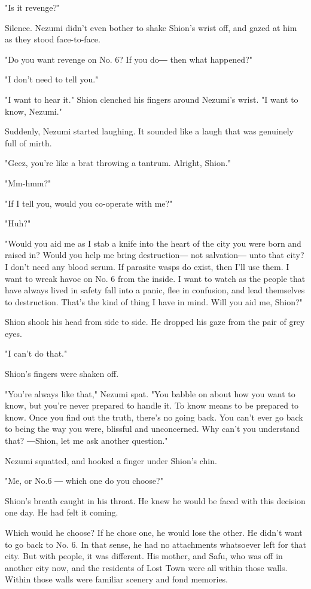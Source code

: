"Is it revenge?"

Silence. Nezumi didn't even bother to shake Shion's wrist off, and gazed
at him as they stood face-to-face.

"Do you want revenge on No. 6? If you do― then what happened?"

"I don't need to tell you."

"I want to hear it." Shion clenched his fingers around Nezumi's wrist.
"I want to know, Nezumi."

Suddenly, Nezumi started laughing. It sounded like a laugh that was
genuinely full of mirth.

"Geez, you're like a brat throwing a tantrum. Alright, Shion."

"Mm-hmm?"

"If I tell you, would you co-operate with me?"

"Huh?"

"Would you aid me as I stab a knife into the heart of the city you were
born and raised in? Would you help me bring destruction― not salvation―
unto that city? I don't need any blood serum. If parasite wasps do
exist, then I'll use them. I want to wreak havoc on No. 6 from the
inside. I want to watch as the people that have always lived in safety
fall into a panic, flee in confusion, and lead themselves to
destruction. That's the kind of thing I have in mind. Will you aid me,
Shion?"

Shion shook his head from side to side. He dropped his gaze from the
pair of grey eyes.

"I can't do that."

Shion's fingers were shaken off.

"You're always like that," Nezumi spat. "You babble on about how you
want to know, but you're never prepared to handle it. To know means to
be prepared to know. Once you find out the truth, there's no going back.
You can't ever go back to being the way you were, blissful and
unconcerned. Why can't you understand that? ―Shion, let me ask another
question."

Nezumi squatted, and hooked a finger under Shion's chin.

"Me, or No.6 ― which one do you choose?"

Shion's breath caught in his throat. He knew he would be faced with this
decision one day. He had felt it coming.

Which would he choose? If he chose one, he would lose the other. He
didn't want to go back to No. 6. In that sense, he had no attachments
whatsoever left for that city. But with people, it was different. His
mother, and Safu, who was off in another city now, and the residents of
Lost Town were all within those walls. Within those walls were familiar
scenery and fond memories.

